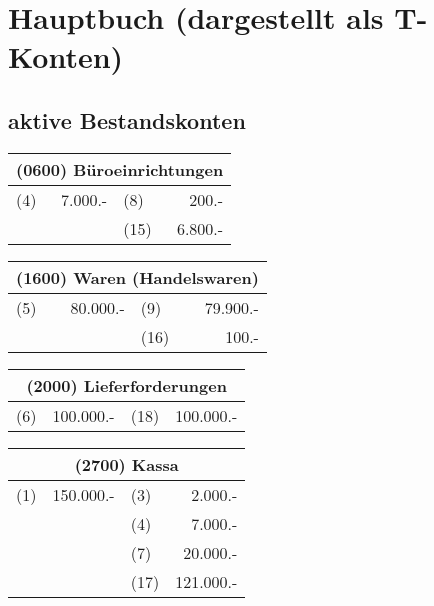 \documentclass[parskip=half,12pt,a4paper]{scrartcl}
\begin{document}
\section{Hauptbuch (dargestellt als T-Konten)}

\subsection{aktive Bestandskonten}

\begin{center}
	\begin{tabular}{lr|lr}
		\multicolumn{4}{c}{(0600) Büroeinrichtungen}\\
		\toprule
		(4) & 7.000.- & (8) & 200.-\\
		& & (15) & 6.800.-\\
		\bottomrule
	\end{tabular}
\end{center}

\begin{center}
	\begin{tabular}{lr|lr}
		\multicolumn{4}{c}{(1600) Waren (Handelswaren)}\\
		\toprule
		(5) & 80.000.- & (9) & 79.900.-\\
		& & (16) & 100.-\\
		\bottomrule
	\end{tabular}
\end{center}

\begin{center}
	\begin{tabular}{lr|lr}
		\multicolumn{4}{c}{(2000) Lieferforderungen}\\
		\toprule
		(6) & 100.000.- & (18) & 100.000.-\\
		\bottomrule
	\end{tabular}
\end{center}

\begin{center}
	\begin{tabular}{lr|lr}
		\multicolumn{4}{c}{(2700) Kassa}\\
		\toprule
		(1) & 150.000.- & (3) & 2.000.-\\
		& & (4) & 7.000.-\\
		& & (7) & 20.000.-\\
		& & (17) & 121.000.-\\
		\bottomrule
	\end{tabular}
\end{center}
\end{document}
